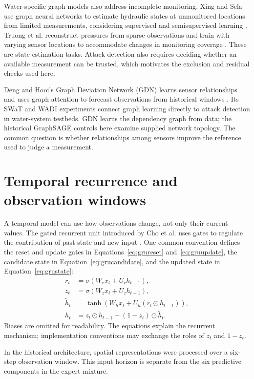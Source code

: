 Water-specific graph models also address incomplete monitoring. Xing and Sela use graph neural networks to estimate hydraulic states at unmonitored locations from limited measurements, considering supervised and semisupervised learning \cite{xing2022state}. Truong et al. reconstruct pressures from sparse observations and train with varying sensor locations to accommodate changes in monitoring coverage \cite{truong2024pressure}. These are state-estimation tasks. Attack detection also requires deciding whether an available measurement can be trusted, which motivates the exclusion and residual checks used here.

Deng and Hooi's Graph Deviation Network (GDN) learns sensor relationships and uses graph attention to forecast observations from historical windows \cite{gdn2021}. Its SWaT and WADI experiments connect graph learning directly to attack detection in water-system testbeds. GDN learns the dependency graph from data; the historical GraphSAGE controls here examine supplied network topology. The common question is whether relationships among sensors improve the reference used to judge a measurement.

\section{Temporal recurrence and observation windows}
A temporal model can use how observations change, not only their current values. The gated recurrent unit introduced by Cho et al. uses gates to regulate the contribution of past state and new input \cite{gru}. One common convention defines the reset and update gates in Equations~\eqref{eq:grureset} and~\eqref{eq:gruupdate}, the candidate state in Equation~\eqref{eq:grucandidate}, and the updated state in Equation~\eqref{eq:grustate}:
\begin{align}
 r_t &= \sigma(W_r x_t+U_r h_{t-1}),\label{eq:grureset}\\
 z_t &= \sigma(W_z x_t+U_z h_{t-1}),\label{eq:gruupdate}\\
 \widetilde h_t &= \tanh(W_h x_t+U_h(r_t\odot h_{t-1})),\label{eq:grucandidate}\\
 h_t &= z_t\odot h_{t-1}+(1-z_t)\odot\widetilde h_t.\label{eq:grustate}
\end{align}
Biases are omitted for readability. The equations explain the recurrent mechanism; implementation conventions may exchange the roles of $z_t$ and $1-z_t$.

In the historical architecture, spatial representations were processed over a six-step observation window. This input horizon is separate from the six predictive components in the expert mixture.

